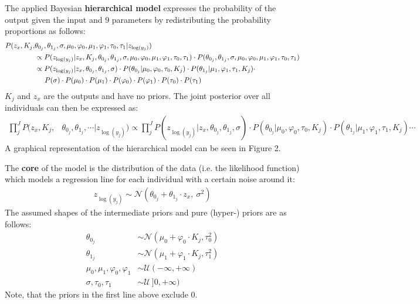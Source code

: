 \documentclass[11pt,a4paper]{article}
\begin{document}
The applied Bayesian \textbf{hierarchical model} expresses the probability of the output given the input and 9 parameters by redistributing the probability proportions as follows:
\begin{align*}
P(z_x, K_j, &\theta_{0_j}, \theta_{1_j}, \sigma, \mu_0, \varphi_0, \mu_1, \varphi_1, \tau_0, \tau_1 | z_{\log(y_j)}) \\
	&\propto P(z_{\log(y_j)} | z_x, K_j, \theta_{0_j}, \theta_{1_j}, \sigma, \mu_0, \varphi_0, \mu_1, \varphi_1, \tau_0, \tau_1) \cdot
	P(\theta_{0_j}, \theta_{1_j}, \sigma, \mu_0, \varphi_0, \mu_1, \varphi_1, \tau_0, \tau_1) \\
	&\propto P(z_{\log(y_j)} | z_x, \theta_{0_j}, \theta_{1_j}, \sigma) 
	\cdot P(\theta_{0_j} |  \mu_0, \varphi_0, \tau_0, K_j) 	
	\cdot P(\theta_{1_j} |  \mu_1, \varphi_1, \tau_1, K_j) \cdot \\
	&\hphantom{{}\propto\ } P(\sigma)
	\cdot P(\mu_0) \cdot P(\mu_1)
	\cdot P(\varphi_0) \cdot P(\varphi_1)
	\cdot P(\tau_0) \cdot P(\tau_1)
\end{align*}
$K_j$ and $z_x$ are the outputs and have no priors.
The joint posterior over all individuals can then be expressed as:
\begin{align*}
\prod_j^J
P(z_x, K_j, &\theta_{0_j}, \theta_{1_j}, \cdots | z_{\log(y_j)}) 
 	\propto \prod_j^J
	P(z_{\log(y_j)} | z_x, \theta_{0_j}, \theta_{1_j}, \sigma) 
	\cdot P(\theta_{0_j} |  \mu_0, \varphi_0, \tau_0, K_j) 	
	\cdot P(\theta_{1_j} |  \mu_1, \varphi_1, \tau_1, K_j) \cdots
\end{align*}
A graphical representation of the hierarchical model can be seen in Figure 2.

The \textbf{core} of the model is the distribution of the data (i.e. the likelihood function) which models a regression line for each individual with a certain noise around it:
\begin{align*}
\boxed{z_{\log(y_j)} \sim \mathcal{N}(\theta_{0_j} + \theta_{1_j} \cdot z_x,\ \sigma^2)}
\end{align*}
The assumed shapes of the intermediate priors and pure (hyper-) priors are as follows:
\begin{align*}
\theta_{0_j} &\sim \mathcal{N}(\mu_0 + \varphi_0 \cdot K_j, \tau_0^2) \\
\theta_{1_j} &\sim \mathcal{N}(\mu_1 + \varphi_1 \cdot K_j, \tau_1^2) \\
\mu_0, \mu_1, \varphi_0, \varphi_1 &\sim \mathcal{U}(-\infty, + \infty) \\
\sigma, \tau_0, \tau_1 &\sim \mathcal{U}\ ]0, + \infty)
\end{align*}
Note, that the priors in the first line above exclude 0.
\end{document}
